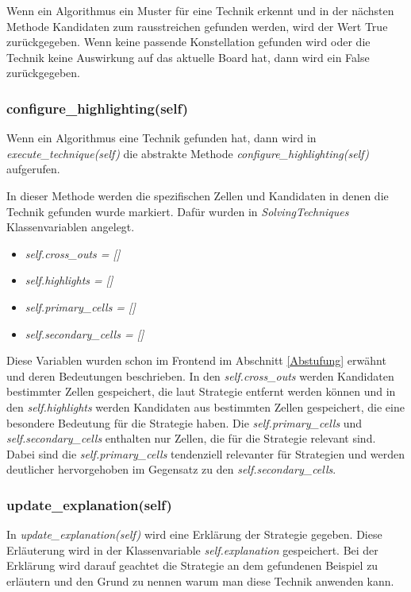 Wenn ein Algorithmus ein Muster für eine Technik erkennt und in der nächsten Methode Kandidaten zum rausstreichen gefunden werden, wird der Wert True zurückgegeben. Wenn keine passende Konstellation gefunden wird oder die Technik keine Auswirkung auf das aktuelle Board hat, dann wird ein False zurückgegeben.

\subsubsection{configure\_highlighting(self)}
Wenn ein Algorithmus eine Technik gefunden hat, dann wird in \textit{execute\_technique(self)} die abstrakte Methode 
\textit{configure\_highlighting(self)} aufgerufen. 

In dieser Methode werden die spezifischen Zellen und Kandidaten in denen die Technik gefunden wurde markiert. Dafür wurden in \textit{SolvingTechniques} Klassenvariablen angelegt. 
\begin{itemize}
	\item \textit{self.cross\_outs = []}
	\item \textit{self.highlights = []}
	\item \textit{self.primary\_cells = []}
	\item \textit{self.secondary\_cells = []}
\end{itemize}

Diese Variablen wurden schon im Frontend im Abschnitt \ref{Abstufung} erwähnt und deren Bedeutungen beschrieben. In den \textit{self.cross\_outs} werden Kandidaten bestimmter Zellen gespeichert, die laut Strategie entfernt werden können und in den \textit{self.highlights} werden Kandidaten aus bestimmten Zellen gespeichert, die eine besondere Bedeutung für die Strategie haben. Die \textit{self.primary\_cells} und \textit{self.secondary\_cells} enthalten nur Zellen, die für die Strategie relevant sind. Dabei sind die \textit{self.primary\_cells} tendenziell relevanter für Strategien und werden deutlicher hervorgehoben im Gegensatz zu den \textit{self.secondary\_cells}.

\subsubsection{update\_explanation(self)}
In \textit{update\_explanation(self)} wird eine Erklärung der Strategie gegeben. Diese Erläuterung wird in der Klassenvariable \textit{self.explanation} gespeichert. Bei der Erklärung wird darauf geachtet die Strategie an dem gefundenen Beispiel zu erläutern und den Grund zu nennen warum man diese Technik anwenden kann.

